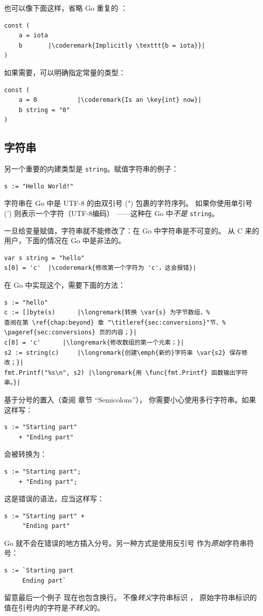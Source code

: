 也可以像下面这样，省略 Go 重复的 ：
\begin{lstlisting}
const (
	a = iota
	b	    |\coderemark{Implicitly \texttt{b = iota}}|
)
\end{lstlisting}
如果需要，可以明确指定常量的类型：
\begin{lstlisting}
const (
	a = 0           |\coderemark{Is an \key{int} now}|
	b string = "0" 
)
\end{lstlisting}

\subsection{字符串}
另一个重要的内建类型是 \lstinline{string}。赋值字符串的例子：
\begin{lstlisting}
s := "Hello World!"
\end{lstlisting}
字符串在 Go 中是 UTF-8 的由双引号 (") 包裹的字符序列。
如果你使用单引号 (') 则表示一个字符（UTF-8编码）
——这种在 Go 中\emph{不是} \lstinline{string}。

一旦给变量赋值，字符串就不能修改了：在 Go 中字符串是不可变的。
从 C 来的用户，下面的情况在 Go 中是非法的。
\begin{lstlisting}
var s string = "hello"
s[0] = 'c'  |\coderemark{修改第一个字符为 'c'，这会报错}|
\end{lstlisting}
在 Go 中实现这个，需要下面的方法：
\begin{lstlisting}
s := "hello"
c := []byte(s)	    |\longremark{转换 \var{s} 为字节数组，%
查阅在第 \ref{chap:beyond} 章 "\titleref{sec:conversions}"节、%
\pageref{sec:conversions} 页的内容；}|
c[0] = 'c'	    |\longremark{修改数组的第一个元素；}|
s2 := string(c)     |\longremark{创建\emph{新的}字符串 \var{s2} 保存修改；}|
fmt.Printf("%s\n", s2) |\longremark{用 \func{fmt.Printf} 函数输出字符串。}|
\end{lstlisting}
\showremarks

\begin{lbar}[多行字符串]
基于分号的置入（查阅 \cite{effective_go} 章节 ``Semicolons''），
你需要小心使用多行字符串。如果这样写：
\begin{lstlisting}
s := "Starting part"
    + "Ending part"
\end{lstlisting}
会被转换为：
\begin{lstlisting}
s := "Starting part";
    + "Ending part";
\end{lstlisting}
这是错误的语法，应当这样写：
\begin{lstlisting}
s := "Starting part" +
     "Ending part"
\end{lstlisting}
Go 就不会在错误的地方插入分号。另一种方式是使用反引号  作为\emph{原始}字符串符号：
\begin{lstlisting}
s := `Starting part
     Ending part`
\end{lstlisting}
留意最后一个例子  现在也包含换行。
不像\emph{转义}字符串标识  ，
原始字符串标识的值在引号内的字符是\emph{不转义}的。
\end{lbar}

